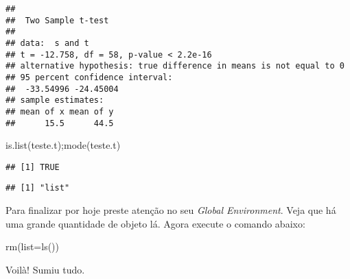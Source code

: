 \documentclass[
]{book}
\newenvironment{Shaded}{\begin{snugshade}}{\end{snugshade}}
\newcommand{\AttributeTok}[1]{\textcolor[rgb]{0.77,0.63,0.00}{#1}}
\newcommand{\FunctionTok}[1]{\textcolor[rgb]{0.00,0.00,0.00}{#1}}
\newcommand{\NormalTok}[1]{#1}
\begin{document}
\begin{verbatim}
## 
##  Two Sample t-test
## 
## data:  s and t
## t = -12.758, df = 58, p-value < 2.2e-16
## alternative hypothesis: true difference in means is not equal to 0
## 95 percent confidence interval:
##  -33.54996 -24.45004
## sample estimates:
## mean of x mean of y 
##      15.5      44.5
\end{verbatim}

\begin{Shaded}
\begin{Highlighting}[]
\FunctionTok{is.list}\NormalTok{(teste.t);}\FunctionTok{mode}\NormalTok{(teste.t)}
\end{Highlighting}
\end{Shaded}

\begin{verbatim}
## [1] TRUE
\end{verbatim}

\begin{verbatim}
## [1] "list"
\end{verbatim}

Para finalizar por hoje preste atenção no seu \emph{Global Environment}.
Veja que há uma grande quantidade de objeto lá. Agora execute o comando abaixo:

\begin{Shaded}
\begin{Highlighting}[]
\FunctionTok{rm}\NormalTok{(}\AttributeTok{list=}\FunctionTok{ls}\NormalTok{())}
\end{Highlighting}
\end{Shaded}

Voilà! Sumiu tudo.

  
\end{document}
